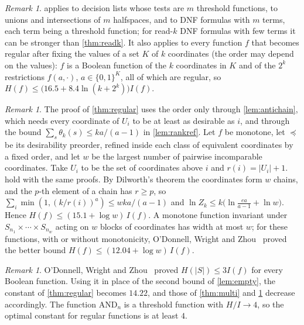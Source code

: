 \documentclass[11pt]{amsart}
\theoremstyle{definition}
\theoremstyle{remark}
\newtheorem{remark}[theorem]{Remark}
\newcommand{\bits}{\{0,1\}}
\begin{document}
\begin{remark}\label{rem:multi-examples}
 applies to decision lists whose tests are $m$ threshold functions, to unions and intersections of
$m$ halfspaces, and to DNF formulas with $m$ terms, each term being a threshold function; for read-$k$ DNF formulas
with few terms it can be stronger than \cref{thm:readk}. It also applies to every function $f$ that becomes regular
after fixing the values of a set $K$ of $k$ coordinates (the order may depend on the values): $f$ is a Boolean
function of the $k$ coordinates in $K$ and of the $2^k$ restrictions $f(a,\cdot)$, $a\in\bits^K$, all of which are
regular, so $H(f)\le\bigl(16.5+8.4\ln(k+2^k)\bigr)I(f)$.
\end{remark}

\begin{remark}\label{rem:width}
The proof of \cref{thm:regular} uses the order only through \cref{lem:antichain}, which needs every coordinate of
$U_i$ to be at least as desirable as $i$, and through the bound $\sum_s\theta_k(s)\le ka/(a-1)$ in
\cref{lem:rankref}. Let $f$ be monotone, let $\preceq$ be its desirability preorder, refined inside each class of
equivalent coordinates by a fixed order, and let $w$ be the largest number of pairwise incomparable coordinates. Take
$U_i$ to be the set of coordinates above $i$ and $r(i)=|U_i|+1$. 
hold with the same proofs. By Dilworth's theorem the coordinates form $w$ chains, and the $p$-th element of a chain
has $r\ge p$, so $\sum_i\min(1,(k/r(i))^a)\le wka/(a-1)$ and $\ln Z_k\le k\bigl(\ln\frac{ea}{a-1}+\ln w\bigr)$.
Hence $H(f)\le(15.1+\log w)\,I(f)$. A monotone function invariant under $S_{n_1}\times\cdots\times S_{n_w}$ acting on
$w$ blocks of coordinates has width at most $w$; for these functions, with or without monotonicity, O'Donnell, Wright
and Zhou~\cite{OWZ11} proved the better bound $H(f)\le(12.04+\log w)\,I(f)$.
\end{remark}

\begin{remark}
O'Donnell, Wright and Zhou~\cite[Theorem~5]{OWZ11} proved $H(|S|)\le3I(f)$ for every Boolean function. Using it in
place of the second bound of \cref{lem:empty}, the constant of \cref{thm:regular} becomes $14.22$, and those of
\cref{thm:multi} and \cref{rem:width} decrease accordingly. The function
$\mathrm{AND}_n$ is a threshold function with $H/I\to4$, so the optimal constant for regular functions is at least
$4$.
\end{remark}
\end{document}
